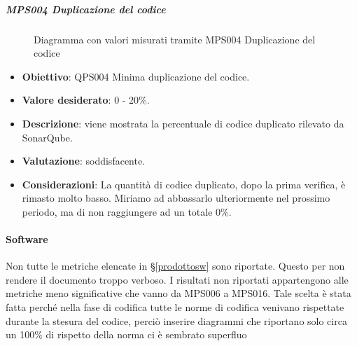 	\subparagraph{MPS004 Duplicazione del codice}
	
	\begin{figure}[H]
		\centering
		\label{immaginePresenzaDupplicazioneCodiceRP}
		\caption{Diagramma con valori misurati tramite MPS004 Duplicazione del codice}
	\end{figure}
	
	\begin{itemize}
		\item \textbf{Obiettivo}: QPS004 Minima duplicazione del codice.
		\item \textbf{Valore desiderato}: 0 - 20\%.
		\item \textbf{Descrizione}: viene mostrata la percentuale di codice duplicato rilevato da SonarQube.
		\item \textbf{Valutazione}: soddisfacente.
		\item \textbf{Considerazioni}: La quantità di codice duplicato, dopo la prima verifica, è rimasto molto basso. Miriamo ad abbassarlo ulteriormente nel prossimo periodo, ma di non raggiungere ad un totale 0\%.
	\end{itemize}
    \paragraph{Software}
    Non tutte le metriche elencate in \S\ref{prodottosw} sono riportate. Questo per non rendere il documento troppo verboso. I risultati non riportati appartengono alle metriche meno significative che vanno da MPS006 a MPS016. Tale scelta è stata fatta perché nella fase di codifica tutte le norme di codifica venivano rispettate durante la stesura del codice, perciò inserire diagrammi che riportano solo circa un 100\% di rispetto della norma ci è sembrato superfluo  

